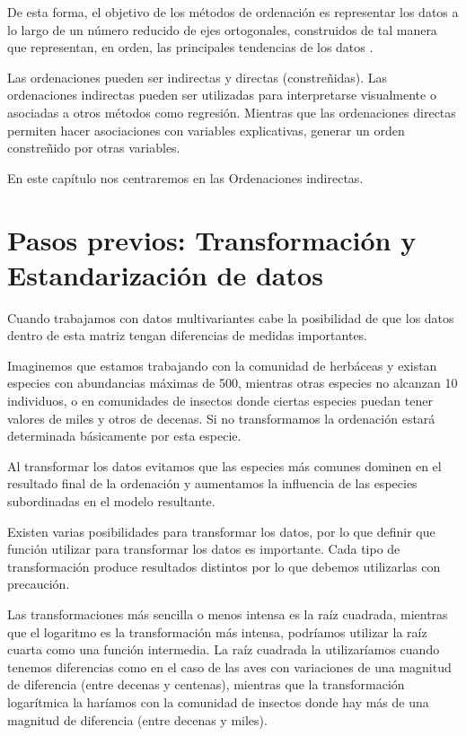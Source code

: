 \documentclass[]{book}
\begin{document}
De esta forma, el objetivo de los métodos de ordenación es representar
los datos a lo largo de un número reducido de ejes ortogonales,
construidos de tal manera que representan, en orden, las principales
tendencias de los datos \citep{Borcard2011}.

Las ordenaciones pueden ser indirectas y directas (constreñidas). Las
ordenaciones indirectas pueden ser utilizadas para interpretarse
visualmente o asociadas a otros métodos como regresión. Mientras que las
ordenaciones directas permiten hacer asociaciones con variables
explicativas, generar un orden constreñido por otras variables.

En este capítulo nos centraremos en las Ordenaciones indirectas.

\section{Pasos previos: Transformación y Estandarización de
datos}\label{pasos-previos-transformacion-y-estandarizacion-de-datos}

Cuando trabajamos con datos multivariantes cabe la posibilidad de que
los datos dentro de esta matriz tengan diferencias de medidas
importantes.

Imaginemos que estamos trabajando con la comunidad de herbáceas y
existan especies con abundancias máximas de 500, mientras otras especies
no alcanzan 10 individuos, o en comunidades de insectos donde ciertas
especies puedan tener valores de miles y otros de decenas. Si no
transformamos la ordenación estará determinada básicamente por esta
especie.

Al transformar los datos evitamos que las especies más comunes dominen
en el resultado final de la ordenación y aumentamos la influencia de las
especies subordinadas en el modelo resultante.

Existen varias posibilidades para transformar los datos, por lo que
definir que función utilizar para transformar los datos es importante.
Cada tipo de transformación produce resultados distintos por lo que
debemos utilizarlas con precaución.

Las transformaciones más sencilla o menos intensa es la raíz cuadrada,
mientras que el logaritmo es la transformación más intensa, podríamos
utilizar la raíz cuarta como una función intermedia. La raíz cuadrada la
utilizaríamos cuando tenemos diferencias como en el caso de las aves con
variaciones de una magnitud de diferencia (entre decenas y centenas),
mientras que la transformación logarítmica la haríamos con la comunidad
de insectos donde hay más de una magnitud de diferencia (entre decenas y
miles).
\end{document}
